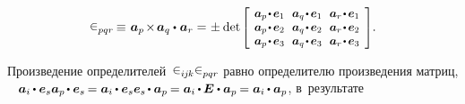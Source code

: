 \begin{otherlanguage}{russian}
\nopagebreak\vspace{-0.4em}\begin{equation*}
\levicivita_{pqr} \hspace{-0.15ex}
\equiv \hspace{.16ex} \bm{a}_p \hspace{-0.25ex} \times \hspace{-0.25ex} \bm{a}_q \dotp \hspace{.1ex} \bm{a}_r =
\hspace{.1ex} \pm \hspace{.1ex} \operatorname{det}\hspace{-0.1ex}
\scalebox{0.92}[0.92]{$\left[\hspace{-0.2ex}\begin{array}{c@{\hspace{.64em}}c@{\hspace{.64em}}c}
\bm{a}_p \narrowdotp\hspace{.12ex} \bm{e}_1 & \bm{a}_q \narrowdotp\hspace{.12ex} \bm{e}_1 & \bm{a}_r \narrowdotp\hspace{.12ex} \bm{e}_1 \\
\bm{a}_p \narrowdotp\hspace{.12ex} \bm{e}_2 & \bm{a}_q \narrowdotp\hspace{.12ex} \bm{e}_2 & \bm{a}_r \narrowdotp\hspace{.12ex} \bm{e}_2 \\
\bm{a}_p \narrowdotp\hspace{.12ex} \bm{e}_3 & \bm{a}_q \narrowdotp\hspace{.12ex} \bm{e}_3 & \bm{a}_r \narrowdotp\hspace{.12ex} \bm{e}_3
\end{array}\hspace{-0.12ex}\right]$} .
\end{equation*}

\vspace{.1em} \noindent
Произведение определителей~${\levicivita_{i\hspace{-0.1ex}j\hspace{-0.1ex}k} \levicivita_{pqr}}$ равно определителю произведения матриц, ~\ru{\:---}  
${\bm{a}_i \hspace{-0.1ex} \dotp \bm{e}_s \bm{a}_p \hspace{-0.2ex} \dotp \bm{e}_s \hspace{-0.2ex}
= \bm{a}_i \hspace{-0.1ex} \dotp \bm{e}_s \bm{e}_s \hspace{-0.2ex} \dotp \bm{a}_p \hspace{-0.15ex}
= \bm{a}_i \hspace{-0.1ex} \dotp \hspace{-0.1ex} \bm{E} \dotp \bm{a}_p \hspace{-0.15ex}
= \bm{a}_i \hspace{-0.1ex} \dotp \bm{a}_p}$, в~результате


\end{otherlanguage}
